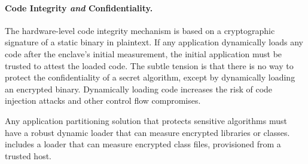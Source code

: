 


\paragraph{Code Integrity {\em and} Confidentiality.} 
The hardware-level \sgx{} code integrity mechanism is based on a cryptographic
signature of a static binary in plaintext.
If any application dynamically loads any code after the enclave's initial measurement,
the initial application must be trusted to attest the loaded code.
The subtle tension is that there is no way to protect the confidentiality of
a secret algorithm, except by dynamically loading an encrypted binary.
Dynamically loading code increases the risk of code injection attacks and other control flow compromises.

Any application partitioning solution that protects sensitive algorithms
must have a robust dynamic loader that can measure encrypted libraries or classes.
\sysname{} includes a loader that can measure encrypted class files,
provisioned from a trusted host.


